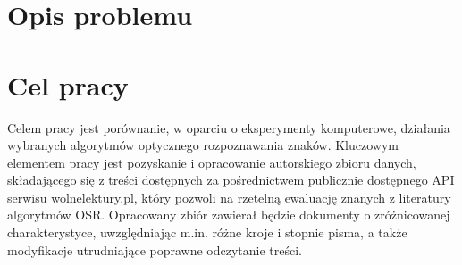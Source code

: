 \label{chapter:wstep}

\section{Opis problemu}


\section{Cel pracy}


Celem pracy jest porównanie, w oparciu o eksperymenty komputerowe, działania wybranych algorytmów optycznego rozpoznawania znaków.
Kluczowym elementem pracy jest pozyskanie i opracowanie autorskiego zbioru danych, składającego się z treści dostępnych za pośrednictwem publicznie dostępnego API serwisu wolnelektury.pl, który pozwoli na rzetelną ewaluację znanych z literatury algorytmów OSR.
Opracowany zbiór zawierał będzie dokumenty o zróżnicowanej charakterystyce, uwzględniając m.in. różne kroje i stopnie pisma, a także modyfikacje utrudniające poprawne odczytanie treści.
